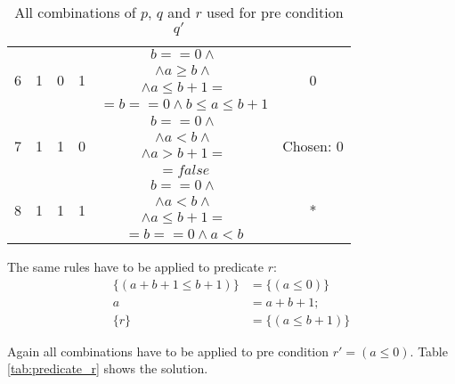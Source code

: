 \begin{table}
\begin{tabular}{ | c | c | c | c | c | c | }
    \multirow{4}{*}{6} & \multirow{4}{*}{1} & \multirow{4}{*}{0} & \multirow{4}{*}{1} & $b == 0 \land $ & \multirow{4}{*}{0} \\
    & & & & $\land a \ge b \land$ & \\
    & & & & $\land a \le b + 1 =$ & \\
    & & & & $= b == 0 \land b \le a \le b + 1$ & \\ \hline

    \multirow{4}{*}{7} & \multirow{4}{*}{1} & \multirow{4}{*}{1} & \multirow{4}{*}{0} & $b == 0 \land $ & \multirow{4}{*}{Chosen: 0} \\
    & & & & $\land a < b \land$ & \\
    & & & & $\land a > b + 1 =$ & \\
    & & & & $= false$ & \\ \hline

    \multirow{4}{*}{8} & \multirow{4}{*}{1} & \multirow{4}{*}{1} & \multirow{4}{*}{1} & $b == 0 \land $ & \multirow{4}{*}{*} \\
    & & & & $\land a < b \land$ & \\
    & & & & $\land a \le b + 1 =$ & \\
    & & & & $= b == 0 \land a < b$ & \\ \hline
  \end{tabular}
  \caption{All combinations of $p$, $q$ and $r$ used for pre condition $q'$}
  \label{tab:predicate_q}
\end{table}

The same rules have to be applied to predicate $r$:
\begin{equation}
\begin{array}{rl}
\{ (a + b + 1 \le b + 1) \} &= \{ (a \le 0) \} \\
a &= a + b + 1;\\
\{r\} &= \{ (a \le b + 1) \}
\end{array}
\end{equation}

Again all combinations have to be applied to pre condition $r' = (a \le 0)$. Table \ref{tab:predicate_r} shows the solution.

